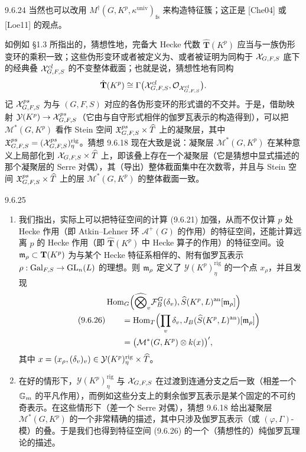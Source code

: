 \begin{rem}{9.6.24}\label{rem:a4-16-9-6-24}
当然也可以改用 $M^\dagger(G,K^p,\kappa^{\mathrm{univ}})_{\mathrm{fs}}$ 来构造特征簇；这正是 [Che04] 或 [Loe11] 的观点。

如例如 §1.3 所指出的，猜想性地，完备大 Hecke 代数 $\hat{\mathbf T}(K^p)$ 应当与一族伪形变环的乘积一致；这些伪形变环或者被定义为、或者被证明为同构于 $\mathcal{X}_{G,F,S}$ 底下的经典叠 $\mathcal{X}^{cl}_{G,F,S}$ 的不变整体截面；也就是说，猜想性地有同构
\[
\hat{\mathbf T}(K^p)\cong\Gamma\bigl(\mathcal{X}^{cl}_{G,F,S},\mathcal{O}_{\mathcal{X}^{cl}_{G,F,S}}\bigr).
\]
记 $\mathcal{X}^{ps}_{G,F,S}$ 为与 $(G,F,S)$ 对应的各伪形变环的形式谱的不交并。于是，借助映射 $\mathcal Y(K^p)\to\mathcal{X}^{ps}_{G,F,S}$（它由与自守形式相伴的伽罗瓦表示的构造得到），可以把 $\mathcal M^*(G,K^p)$ 看作 Stein 空间 $\mathfrak X^{ps}_{G,F,S}\times\widehat T$ 上的凝聚层，其中 $\mathfrak X^{ps}_{G,F,S}=(\mathcal{X}^{ps}_{G,F,S})^{\mathrm{rig}}_\eta$。猜想 9.6.18 现在大致是说：凝聚层 $\mathcal M^*(G,K^p)$ 在某种意义上局部化到 $\mathcal{X}_{G,F,S}\times\widehat T$ 上，即该叠上存在一个凝聚层（它是猜想中显式描述的那个凝聚层的 Serre 对偶），其（导出）整体截面集中在次数零，并且与 Stein 空间 $\mathfrak X^{ps}_{G,F,S}\times\widehat T$ 上的层 $\mathcal M^*(G,K^p)$ 的整体截面一致。
\end{rem}

\begin{rem}{9.6.25}\label{rem:a4-16-9-6-25}
\begin{enumerate}
\item[(i)] 我们指出，实际上可以把特征空间的计算 (9.6.21) 加强，从而不仅计算 $p$ 处 Hecke 作用（即 Atkin--Lehner 环 $\mathcal A^+(G)$ 的作用）的特征空间，还能计算远离 $p$ 的 Hecke 作用（即 $\hat{\mathbf T}(K^p)$ 中 Hecke 算子的作用）的特征空间。设 $\mathfrak{m}_\rho\subset\mathbf T(K^p)$ 为与某个 Hecke 特征系相伴的、附有伽罗瓦表示 $\rho:\operatorname{Gal}_{F,S}\to\mathrm{GL}_n(L)$ 的理想。则 $\mathfrak{m}_\rho$ 定义了 $\mathcal Y(K^p)^{\mathrm{rig}}_\eta$ 的一个点 $x_\rho$，并且发现
\begin{equation}\tag{9.6.26}\label{eq:a4-16-9-6-26}
\begin{aligned}
&\operatorname{Hom}_G\Bigl(\widehat{\bigotimes}_v\mathcal F_B^G(\delta_v),\widehat S(K^p,L)^{\mathrm{an}}[\mathfrak{m}_\rho]\Bigr)\\
&\qquad=\operatorname{Hom}_T\Bigl(\prod_v\delta_v,J_B(\widehat S(K^p,L)^{\mathrm{an}})[\mathfrak{m}_\rho]\Bigr)\\
&\qquad=\bigl(\mathcal M^*(G,K^p)\otimes k(x)\bigr)',
\end{aligned}
\end{equation}
其中 $x=(x_\rho,(\delta_v)_v)\in\mathcal Y(K^p)^{\mathrm{rig}}_\eta\times\widehat T$。
\item[(ii)] 在好的情形下，$\mathcal Y(K^p)^{\mathrm{rig}}_\eta$ 与 $\mathcal{X}_{G,F,S}$ 在过渡到连通分支之后一致（相差一个 $\mathbb{G}_m$ 的平凡作用），而例如这些分支上的剩余伽罗瓦表示是某个固定的不可约奇表示。在这些情形下（差一个 Serre 对偶），猜想 9.6.18 给出凝聚层 $\mathcal M^*(G,K^p)$ 的一个非常精确的描述，其中只涉及伽罗瓦表示（或 $(\varphi,\Gamma)$-模）的叠。于是我们也得到特征空间 (9.6.26) 的一个（猜想性的）纯伽罗瓦理论的描述。
\end{enumerate}
\end{rem}


